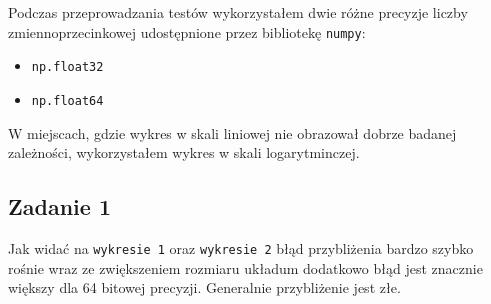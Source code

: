 \documentclass{article}
\begin{document}
\noindent
Podczas przeprowadzania testów wykorzystałem dwie różne precyzje liczby zmiennoprzecinkowej udostępnione przez bibliotekę \texttt{numpy}:

\noindent
\begin{itemize}
    \item \texttt{np.float32}
    \item \texttt{np.float64}
\end{itemize}

\noindent
W miejscach, gdzie wykres w skali liniowej nie obrazował dobrze badanej zależności, wykorzystałem wykres w skali logarytminczej.

\subsection{Zadanie 1}

Jak widać na \texttt{wykresie 1} oraz \texttt{wykresie 2} błąd przybliżenia bardzo szybko rośnie wraz ze zwiększeniem rozmiaru układum dodatkowo błąd jest znacznie większy dla 64 bitowej precyzji. Generalnie przybliżenie jest złe.
\end{document}
